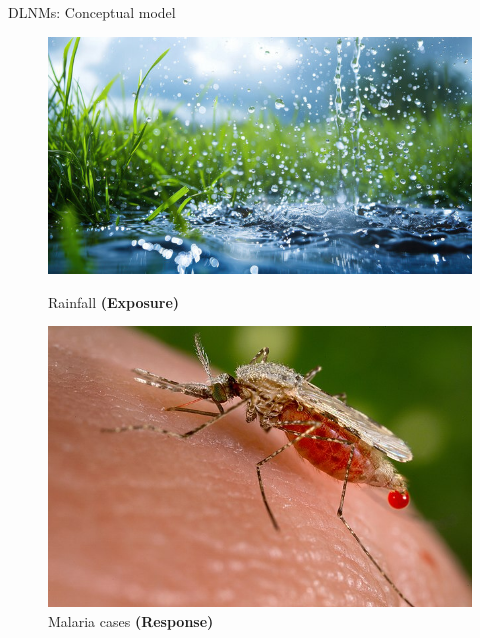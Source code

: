 \documentclass[english]{beamer}
\newcommand{\alertblue}[1]{{\color{blue}#1}}
\begin{document}
\begin{frame}{DLNMs: Conceptual model}
\begin{figure}
    \centering
    \begin{minipage}{0.2\linewidth}
        \includegraphics[width=\linewidth]{images/rainfall.jpg}
        \caption{\footnotesize Rainfall \textbf{(Exposure)}}
    \end{minipage}
    \hspace{0.5cm}
    \hspace{0.5cm}
    \begin{minipage}{0.2\linewidth}
        \centering
        \includegraphics[width=\linewidth]{images/malaria.jpeg}
        \caption{\footnotesize Malaria cases \textbf{(Response)}}
    \end{minipage}

\end{figure}
\end{frame}
\end{document}
